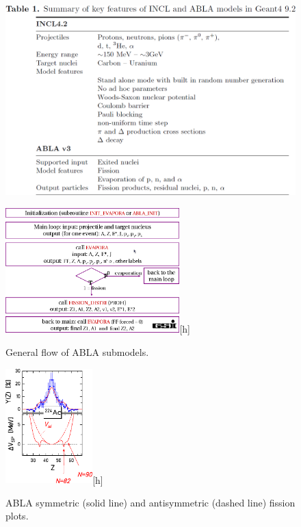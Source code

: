 \begin{figure}[h] 
\begin{center}
\includegraphics[width=1\textwidth]{images/inclSummary.png}  
\caption{\label{fig:inclpotential}}
 
 \end{center}
 \end{figure}


\begin{figure}[h] 
\begin{center}
\includegraphics[width=0.6\textwidth]{images/AblaTable.png}[h]  
\caption{\label{fig:ablatable} General flow of ABLA submodels.}
 
 \end{center}
 \end{figure}
\begin{figure}[h] 
\begin{center}
\includegraphics[width=0.3\textwidth]{images/AblaHumps.png}[h]  
\caption{\label{fig:ablahumps} ABLA symmetric (solid line) and antisymmetric (dashed line) fission plots.}
 
 \end{center}
 \end{figure}

